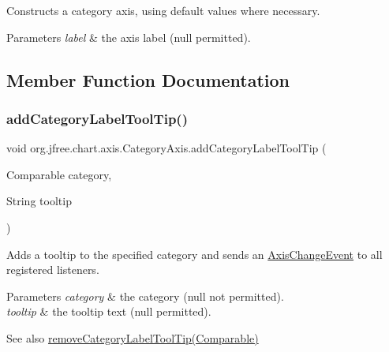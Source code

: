 Constructs a category axis, using default values where necessary.


\begin{DoxyParams}{Parameters}
{\em label} & the axis label ({\ttfamily null} permitted). \\
\hline
\end{DoxyParams}


\subsection{Member Function Documentation}
\mbox{\label{classorg_1_1jfree_1_1chart_1_1axis_1_1_category_axis_af13a9e516099c2898e94ccc1196a105e}} 
\subsubsection{\texorpdfstring{add\+Category\+Label\+Tool\+Tip()}{addCategoryLabelToolTip()}}
{\footnotesize\ttfamily void org.\+jfree.\+chart.\+axis.\+Category\+Axis.\+add\+Category\+Label\+Tool\+Tip (\begin{DoxyParamCaption}\item[{Comparable}]{category,  }\item[{String}]{tooltip }\end{DoxyParamCaption})}

Adds a tooltip to the specified category and sends an \mbox{\hyperlink{}{Axis\+Change\+Event}} to all registered listeners.


\begin{DoxyParams}{Parameters}
{\em category} & the category ({\ttfamily null} not permitted). \\
\hline
{\em tooltip} & the tooltip text ({\ttfamily null} permitted).\\
\hline
\end{DoxyParams}
\begin{DoxySeeAlso}{See also}
\mbox{\hyperlink{classorg_1_1jfree_1_1chart_1_1axis_1_1_category_axis_aeaffa3c7cecfeacf63ef280d29216bbd}{remove\+Category\+Label\+Tool\+Tip(\+Comparable)}} 
\end{DoxySeeAlso}
\mbox{\label{classorg_1_1jfree_1_1chart_1_1axis_1_1_category_axis_a305f59a6b2cd0512e01e4b08de21d36b}} 
